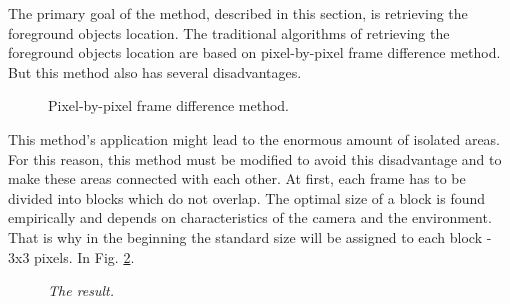 \documentclass[12pt,a4paper,oneside,titlepage]{article}
\begin{document}
The primary goal of the method, described in this section, is retrieving the foreground objects location.
The traditional algorithms of retrieving the foreground objects location are based on pixel-by-pixel frame difference method.
But this method also has several disadvantages.

\begin{figure}[h]
  \vspace{-5ex}
  \caption{Pixel-by-pixel frame difference method.}
  \label{fig:fig1}
\end{figure}


This method's application might lead to the enormous amount of isolated areas.
For this reason, this method must be modified to avoid this disadvantage and to make these areas connected with each other.
At first, each frame has to be divided into blocks which do not overlap.
The optimal size of a block is found empirically and depends on characteristics of the camera and the environment.
That is why in the beginning the standard size will be assigned to each block - 3x3 pixels.
In Fig. \ref{fig:fig2}.

\begin{figure}[h]
  \vspace{-5ex}
  \caption{\textit{The result.}}
  \label{fig:fig2}
\end{figure}
\end{document}
